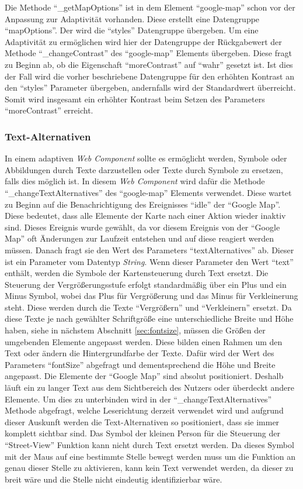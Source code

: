 \documentclass[12pt, paper=a4, bibtotoc, toc=listof, headsepline=true]{scrreprt}
\begin{document}
Die Methode \enquote{\_getMapOptions} ist in dem Element \enquote{google-map} schon vor der Anpassung zur Adaptivität vorhanden. Diese erstellt eine Datengruppe \enquote{mapOptions}. Der wird die \enquote{styles} Datengruppe übergeben. Um eine Adaptivität zu ermöglichen wird hier der Datengruppe der Rückgabewert der Methode \enquote{\_changeContrast} des \enquote{google-map} Elements übergeben. Diese fragt zu Beginn ab, ob die Eigenschaft \enquote{moreContrast} auf \enquote{wahr} gesetzt ist. Ist dies der Fall wird die vorher beschriebene Datengruppe für den erhöhten Kontrast an den \enquote{styles} Parameter übergeben, andernfalls wird der Standardwert überreicht. Somit wird insgesamt ein erhöhter Kontrast beim Setzen des Parameters \enquote{moreContrast} erreicht. 
	\subsubsection{Text-Alternativen}
	In einem adaptiven \emph{Web Component} sollte es ermöglicht werden, Symbole oder Abbildungen durch Texte darzustellen oder Texte durch Symbole zu ersetzen, falls dies möglich ist. In diesem \emph{Web Component} wird dafür die Methode \enquote{\_changeTextAlternatives} des \enquote{google-map} Elements verwendet. Diese wartet zu Beginn auf die Benachrichtigung des Ereignisses \enquote{idle} der \enquote{Google Map}. Diese bedeutet, dass alle Elemente der Karte nach einer Aktion wieder inaktiv sind. Dieses Ereignis wurde gewählt, da vor diesem Ereignis von der \enquote{Google Map} oft Änderungen zur Laufzeit entstehen und auf diese reagiert werden müssen. Danach fragt sie den Wert des Parameters \enquote{textAlternatives} ab. Dieser ist ein Parameter vom Datentyp \emph{String}. Wenn dieser Parameter den Wert \enquote{text} enthält, werden die Symbole der Kartensteuerung durch Text ersetzt. Die Steuerung der Vergrößerungsstufe erfolgt standardmäßig über ein Plus und ein Minus Symbol, wobei das Plus für Vergrößerung und das Minus für Verkleinerung steht. Diese werden durch die Texte \enquote{Vergrößern} und \enquote{Verkleinern} ersetzt. Da diese Texte je nach gewählter Schriftgröße eine unterschiedliche Breite und Höhe haben, siehe in nächstem Abschnitt \ref{sec:fontsize}, müssen die Größen der umgebenden Elemente angepasst werden. Diese bilden einen Rahmen um den Text oder ändern die Hintergrundfarbe der Texte. Dafür wird der Wert des Parameters \enquote{fontSize} abgefragt und dementsprechend die Höhe und Breite angepasst. Die Elemente der \enquote{Google Map} sind absolut positioniert. Deshalb läuft ein zu langer Text aus dem Sichtbereich des Nutzers oder überdeckt andere Elemente. Um dies zu unterbinden wird in der \enquote{\_changeTextAlternatives} Methode abgefragt, welche Leserichtung derzeit verwendet wird und aufgrund dieser Auskunft werden die Text-Alternativen so positioniert, dass sie immer komplett sichtbar sind. Das Symbol der kleinen Person für die Steuerung der \enquote{Street-View} Funktion kann nicht durch Text ersetzt werden. Da dieses Symbol mit der Maus auf eine bestimmte Stelle bewegt werden muss um die Funktion an genau dieser Stelle zu aktivieren, kann kein Text verwendet werden, da dieser zu breit wäre und die Stelle nicht eindeutig identifizierbar wäre. 
\end{document}
